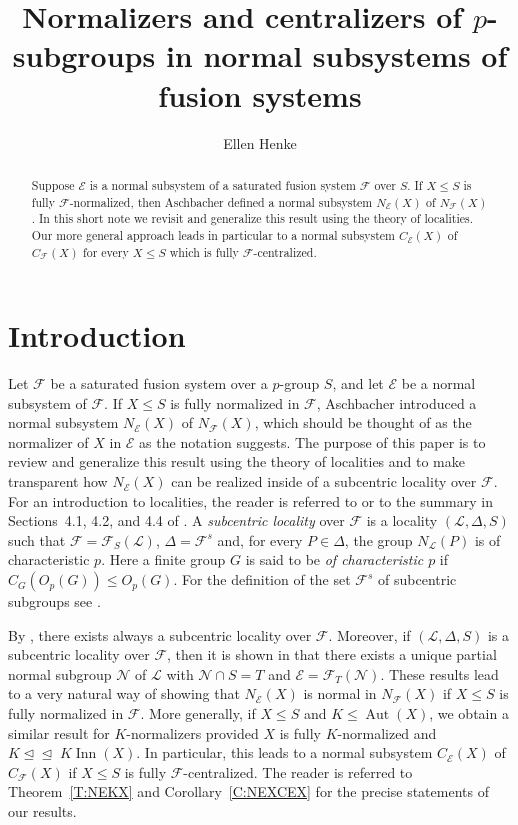 \documentclass[reqno,11pt]{amsart}
\title[Normalizers and centralizers of $p$-subgroups in normal subsystems of fusion systems]{Normalizers and centralizers of $p$-subgroups in normal subsystems of fusion systems}
\author[E.~Henke]{Ellen Henke}
\numberwithin{equation}{section}
\theoremstyle{definition}
\newcommand{\F}{\mathcal{F}}
\newcommand{\E}{\mathcal{E}}
\renewcommand{\L}{\mathcal{L}}
\newcommand{\N}{\mathcal{N}}
\newcommand{\Aut}{\operatorname{Aut}}
\newcommand{\Inn}{\operatorname{Inn}}
\newcommand{\subn}{\unlhd\!\unlhd\;}
\begin{document}
\begin{abstract}
Suppose $\E$ is a normal subsystem of a saturated fusion system $\F$ over $S$. If $X\leq S$ is fully $\F$-normalized, then Aschbacher defined a normal subsystem $N_\E(X)$ of $N_\F(X)$. In this short note we revisit and generalize this result using the theory of localities. Our more general approach leads in particular to a normal subsystem $C_\E(X)$ of $C_\F(X)$ for every $X\leq S$ which is fully $\F$-centralized.
\end{abstract}

\maketitle







\section{Introduction}

Let $\F$ be a saturated fusion system over a $p$-group $S$, and let $\E$ be a normal subsystem of $\F$. If $X\leq S$ is fully normalized in $\F$, Aschbacher \cite[8.24]{Aschbacher:2011} introduced a normal subsystem $N_\E(X)$ of $N_\F(X)$, which should be thought of as the normalizer of $X$ in $\E$ as the notation suggests. The purpose of this paper is to review and generalize this result using the theory of localities and to make transparent how $N_\E(X)$ can be realized inside of a subcentric locality over $\F$. For an introduction to localities, the reader is referred to \cite{Chermak:2015} or to the summary in Sections~4.1, 4.2, and 4.4  of \cite{Henke:Regular}. A \textit{subcentric locality} over $\F$ is a locality $(\L,\Delta,S)$ such that $\F=\F_S(\L)$, $\Delta=\F^s$ and, for every $P\in\Delta$, the group $N_\L(P)$ is of characteristic $p$. Here a finite group $G$ is said to be \emph{of characteristic $p$} if $C_G(O_p(G))\leq O_p(G)$. For the definition of the set $\F^s$ of subcentric subgroups see \cite[Definition~1]{Henke:2015}. 

\smallskip

By \cite[Theorem~A]{Henke:2015}, there exists always a subcentric locality over $\F$. Moreover, if $(\L,\Delta,S)$ is a subcentric locality over $\F$, then it is shown in \cite[Theorem~A]{Chermak/Henke} that there exists a unique partial normal subgroup $\N$ of $\L$ with $\N\cap S=T$ and $\E=\F_T(\N)$. These results lead to a very natural way of showing that $N_\E(X)$ is normal in $N_\F(X)$ if $X\leq S$ is fully normalized in $\F$. More generally, if $X\leq S$ and $K\leq \Aut(X)$, we obtain a similar result for $K$-normalizers provided $X$ is fully $K$-normalized and $K\subn K\Inn(X)$. In particular, this leads to a normal subsystem $C_\E(X)$ of $C_\F(X)$ if $X\leq S$ is fully $\F$-centralized. The reader is referred to Theorem~\ref{T:NEKX} and Corollary~\ref{C:NEXCEX} for the precise statements of our results.
\end{document}
